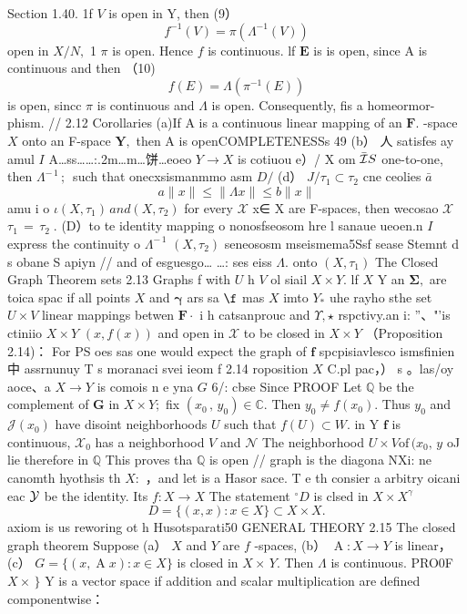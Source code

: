Section 1.40. 1f ${\mathbf{}}V$ is open in Y, then (9） $$ f^{-1}(V)=\pi(\Lambda^{-1}(V)) $$ open in $X/N,$ 1 $\textstyle\pi$ is open. Hence $\boldsymbol{\mathit{f}}$ is continuous. lf $\boldsymbol{E}$ is is open, since A is continuous and then （10) $$ f(E)=\Lambda(\pi^{-1}(E)) $$ is open, sincc $\textstyle\pi$ is continuous and $\Lambda$ is open. Consequently, fis a homeormor- phism. // 2.12 Corollaries (a)If A is a continuous linear mapping of an ${\boldsymbol{F}}.$ -space $\textstyle X$ onto an F-space ${\boldsymbol{Y}},$ then A is openCOMPLETENESSs 49 (b） 人 satisfes ay amul $\boldsymbol{\mathit{I}}$ A…ss……:.2m…m…饼…eoeo $Y\to X$ is cotiuou e）/ X om $\bar{\cal{I}}S$ one-to-one, then $\Lambda^{-\,1}\,;\,$ such that onecxsismanmmo asm $D\!\!\!\!/$ (d） $J/\tau_{1}\subset\tau_{2}$ cne ceolies $\bar{a}$ $$ a\|x\|\leq\|\Lambda x\|\leq b\|x\| $$ amu i o $\iota\left(X,\tau_{1}\right)\,a n d\left(X,\tau_{2}\right)$ for every $\textstyle{\mathcal{X}}$ x∈ X are F-spaces, then wecosao $\textstyle{\mathcal{X}}$ $\tau_{1}\,=\,\tau_{2}\;.$ (D）to te identity mapping o nonosfseosom hre l sanaue ueoen.n $\boldsymbol{\mathit{I}}$ express the continuity o $\Lambda^{-\,1}$ $(X,\tau_{2})$ seneososm mseismema5Ssf sease Stemnt d s obane S apiyn // and of esguesgo… …: ses eiss $\Lambda.$ onto $(X,\tau_{1})$ The Closed Graph Theorem sets 2.13 Graphs f with $U$ h ${\mathit{V}}$ ol siail $X\times Y.$ lf $\textstyle{X}$ Y an $\mathbf{\Sigma},$ are toica spac if all points $X$ and $\boldsymbol{\gamma}$ ars sa $\boldsymbol{\f}$ mas $\textstyle X$ imto $\textstyle Y_{*}$ uhe rayho sthe set $U\times V$ linear mappings betwen ${\boldsymbol{F}}\cdot$ i h catsanprouc and ${\Upsilon},{\star}$ rspctivy.an i: ”、"'is ctiniio $X\times Y$ $(x,f(x))$ and open in $\textstyle{\mathcal{X}}$ to be closed in $X\times Y$ （Proposition 2.14)： For PS oes sas one would expect the graph of $\boldsymbol{f}$ spcpisiavlesco ismsfinien中 assrnunuy T s moranaci svei ieom f 2.14 roposition $\textstyle X$ C.pl pac，） s 。las/oy aoce、a $X\to Y$ is comois n e yna $\boldsymbol{\mathit{G}}$ 6/: cbse Since PROOF Let $\mathbb{Q}$ be the complement of ${\boldsymbol{G}}$ in $X\times Y;$ fix $(x_{0}\,,\,y_{0})\in\mathbb{C}.$ Then $y_{0}\neq f(x_{0}).$ Thus $y_{0}$ and ${\mathcal{J}}(x_{0})$ have disoint neighborhoods $U$ such that $f(U)\subset W.$ in Y $\boldsymbol{f}$ is continuous, ${\mathcal{X}}_{0}$ has a neighborhood ${\mathbf{}}V$ and ${\mathcal{N}}$ The neighborhood $U\times V\mathrm{of}\,(x_{0},\,y$ oJ lie therefore in $\mathbb{Q}$ This proves tha $\mathbb{Q}$ is open // graph is the diagona NXi: ne canomth hyothsis th $X\colon$ ，and let is a Hasor sace. T e th consier a arbitry oicani eac ${\cal{Y}}$ be the identity. Its $f\colon X\to X$ The statement $^{\circ}\!D$ is clsed in $X\times X^{\gamma}$ $$ D=\{(x,x)\colon x\in X\}\subset X\times X. $$ axiom is us reworing ot h Husotsparati50 GENERAL THEORY 2.15 The closed graph theorem Suppose (a） $\textstyle X$ and ${\mathbf{}}Y$ are $\boldsymbol{\mathit{f}}$ -spaces, (b） $\operatorname{A}\!:X\to Y$ is linear， (c） $G=\{(x,\operatorname{A}x)\colon x\in X\}$ is closed in $X\times\,Y.$ Then $\Lambda$ is continuous. PRO0F $X\times\,\}$ Y is a vector space if addition and scalar multiplication are defined componentwise： $$ 